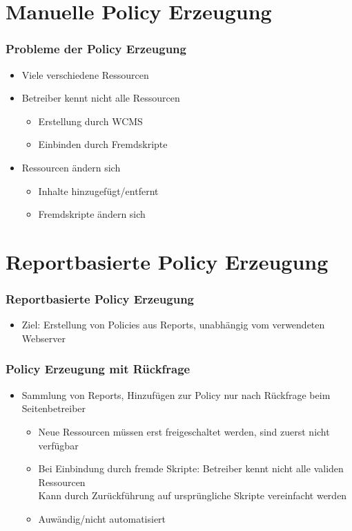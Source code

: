 \documentclass[handout]{beamer}
\begin{document}
\section{Manuelle Policy Erzeugung}
\begin{frame}[c]
\frametitle{Probleme der Policy Erzeugung}
\begin{itemize}
\item Viele verschiedene Ressourcen
\item Betreiber kennt nicht alle Ressourcen
\begin{itemize}
\item Erstellung durch WCMS
\item Einbinden durch Fremdskripte
\end{itemize}
\item Ressourcen ändern sich
\begin{itemize}
\item Inhalte hinzugefügt/entfernt
\item Fremdskripte ändern sich
\end{itemize}
\end{itemize}
\end{frame}

\section{Reportbasierte Policy Erzeugung}
\begin{frame}[c]
\frametitle{Reportbasierte Policy Erzeugung}
\begin{itemize}
\item Ziel: Erstellung von Policies aus Reports, unabhängig vom verwendeten Webserver
\end{itemize}
\end{frame}

\begin{frame}[c]
\frametitle{Policy Erzeugung mit Rückfrage}
\begin{itemize}
\item Sammlung von Reports, Hinzufügen zur Policy nur nach Rückfrage beim Seitenbetreiber
\begin{itemize}
\item Neue Ressourcen müssen erst freigeschaltet werden, sind zuerst nicht verfügbar
\item Bei Einbindung durch fremde Skripte: Betreiber kennt nicht alle validen Ressourcen\\
Kann durch Zurückführung auf ursprüngliche Skripte vereinfacht werden
\item Auwändig/nicht automatisiert
\end{itemize}
\end{itemize}
\end{frame}
\end{document}
